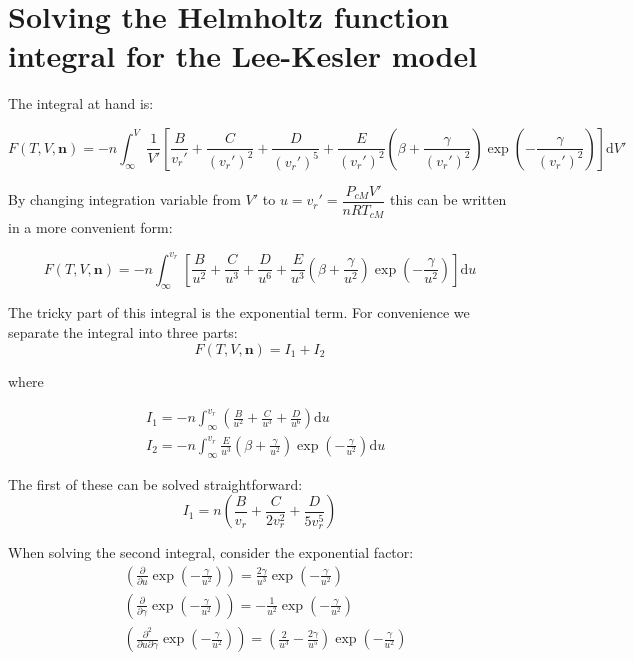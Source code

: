 \documentclass[internal,english]{sintefmemo2012}
\numberwithin{equation}{section}
\newcommand*{\pd}[2]{\frac{\partial #1}{\partial #2}}
\begin{document}
\section{Solving the Helmholtz function integral for the Lee-Kesler model}
\label{app:integral}
The integral at hand is:

\begin{equation}
F(T,V,\textbf{n}) = - n \int_\infty ^V \frac{1}{V'} \left[\frac{B}{v_r '} + \frac{C}{(v_r ') ^2 } + \frac{D}{(v_r ')^5} + \frac{E}{(v_r ')^2} \left( \beta + \frac{\gamma}{(v_r ')^2} \right) \exp{\left(-\frac{\gamma}{(v_r ')^2}\right)} \right] \mathrm{d}V'
\end{equation}

By changing integration variable from $V'$ to $u = v_r ' = \dfrac{P_{cM} V'}{n R T_{cM}}$ this can be written in a more convenient form:

\begin{equation}
F(T,V,\textbf{n}) = - n \int_\infty ^{v_r} \left[\frac{B}{u^2} + \frac{C}{u^3} + \frac{D}{u^6} + \frac{E}{u^3} \left( \beta + \frac{\gamma}{u^2} \right) \exp{\left(-\frac{\gamma}{u^2}\right)} \right] \mathrm{d}u
\end{equation}

The tricky part of this integral is the exponential term. For convenience we separate the integral into three parts:
\begin{equation}
F(T,V,\textbf{n}) = I_1 + I_2
\end{equation}

where

\begin{align}
& I_1 = - n \int_\infty ^{v_r} \left(\frac{B}{u^2} + \frac{C}{u^3} + \frac{D}{u^6} \right) \mathrm{d}u \\
& I_2 = - n \int_\infty ^{v_r} \frac{E}{u^3} \left(\beta + \frac{\gamma}{u^2} \right) \exp{\left(-\frac{\gamma}{u^2}\right)}  \mathrm{d}u
\end{align}

The first of these can be solved straightforward:
\begin{equation}
I_1 = n \left(\frac{B}{v_r} + \frac{C}{2 v_r^2} + \frac{D}{5 v_r^5} \right)
\end{equation}

When solving the second integral, consider the exponential factor:
\begin{align}
& \left( \pd{}{u} \exp{\left(-\frac{\gamma}{u^2} \right) } \right)= \frac{2 \gamma}{u^3} \exp{\left(-\frac{\gamma}{u^2} \right) }\\
& \left( \pd{}{\gamma} \exp{\left(-\frac{\gamma}{u^2} \right) } \right) = - \frac{1}{u^2}\exp{\left(-\frac{\gamma}{u^2} \right) } \\
& \left(\frac{\partial^2}{\partial u \partial \gamma} \exp{\left(-\frac{\gamma}{u^2}\right)} \right) = \left(\frac{2}{u^3} - \frac{2\gamma}{u^5}\right) \exp{\left(-\frac{\gamma}{u^2}\right)}
\end{align}
\end{document}
